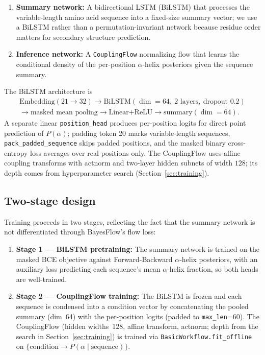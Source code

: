 \documentclass[12pt]{article}
\begin{document}
\begin{enumerate}
    \item \textbf{Summary network:} A bidirectional LSTM (BiLSTM) that processes the
    variable-length amino acid sequence into a fixed-size summary vector; we use a
    BiLSTM rather than a permutation-invariant network because residue order matters
    for secondary structure prediction.
    \item \textbf{Inference network:} A \texttt{CouplingFlow} normalizing flow
    \parencite{couplingflow} that learns the conditional density of the per-position
    $\alpha$-helix posteriors given the sequence summary.
\end{enumerate}

The BiLSTM architecture is
\begin{multline*}
\text{Embedding}(21\to 32) \to \text{BiLSTM}(\dim=64,\ \text{2 layers},\ \text{dropout }0.2) \\
\to \text{masked mean pooling} \to \text{Linear+ReLU} \to \text{summary}(\dim=64).
\end{multline*}
A separate linear \texttt{position\_head} produces per-position logits for
direct point prediction of $P(\alpha)$; padding token 20 marks variable-length
sequences, \texttt{pack\_\allowbreak padded\_\allowbreak sequence} skips
padded positions, and the masked binary cross-entropy loss averages over real
positions only. The CouplingFlow uses affine coupling transforms with actnorm
and two-layer hidden subnets of width $128$; its depth comes from
hyperparameter search (Section~\ref{sec:training}).

\subsection{Two-stage design}

Training proceeds in two stages, reflecting the fact that the summary network is not
differentiated through BayesFlow's flow loss:

\begin{enumerate}
    \item \textbf{Stage 1 — BiLSTM pretraining:} The summary network is trained
    on the masked BCE objective against Forward-Backward $\alpha$-helix
    posteriors, with an auxiliary loss predicting each sequence's mean $\alpha$-helix
    fraction, so both heads are well-trained.
    \item \textbf{Stage 2 — CouplingFlow training:} The BiLSTM is frozen and
    each sequence is condensed into a condition vector by concatenating the pooled
    summary (dim~64) with the per-position logits (padded to \texttt{max\_len}=60).
    The CouplingFlow (hidden widths~128, affine transform, actnorm; depth
    from the search in Section~\ref{sec:training})
    is trained via \texttt{BasicWorkflow.fit\_offline} on
    $\{\text{condition} \to P(\alpha \mid \text{sequence})\}$.
\end{enumerate}
\end{document}
